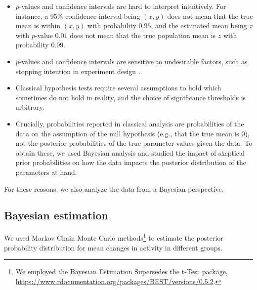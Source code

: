 \documentclass[a4paper,fleqn]{cas-dc}
\begin{document}
\begin{itemize}
\item
  \(p\)-values and confidence intervals are hard to interpret
  intuitively. For instance, a 95\% confidence interval being \((x,y)\)
  does not mean that the true mean is within \((x,y)\) with probability
  \(0.95\), and the estimated mean being \(z\) with \(p\)-value \(0.01\)
  does not mean that the true population mean is \(z\) with probability
  \(0.99\).
\item
  \(p\)-values and confidence intervals are sensitive to undesirable
  factors, such as stopping intention in experiment design \citep{Kruschke2015}.
\item
  Classical hypothesis tests require several assumptions to hold which
  sometimes do not hold in reality, and the choice of significance
  thresholds is arbitrary.
\item
  Crucially, probabilities reported in classical analysis are
  probabilities of the data on the assumption of the null hypothesis
  (e.g., that the true mean is 0), not the posterior probabilities of
  the true parameter values given the data. To obtain these, we used
  Bayesian analysis and studied the impact of skeptical prior
  probabilities on how the data impacts the posterior distribution of
  the parameters at hand.
\end{itemize}

For these reasons, we also analyze the data from a Bayesian perspective.







\subsection{Bayesian estimation}

We used Markov Chain Monte Carlo methods\footnote{We employed the
  \textsf{Bayesian Estimation Supersedes the t-Test} package,
  \url{https://www.rdocumentation.org/packages/BEST/versions/0.5.2}.} to
estimate the posterior probability distribution for mean changes in
activity in different groups.
\end{document}
